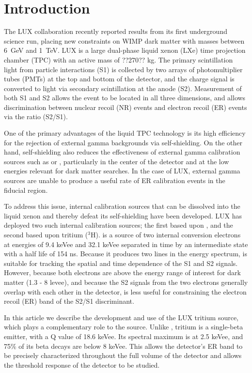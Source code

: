 \section{Introduction}

The LUX collaboration recently reported results from its first underground science run, placing new constraints on WIMP dark matter with masses between 6~GeV and 1~TeV\cite{lux_prl}. LUX is a large dual-phase liquid xenon (LXe) time projection chamber (TPC) with an active mass of ??270?? kg. The primary scintillation light from particle interactions (S1) is collected by two arrays of photomultiplier tubes (PMTs) at the top and bottom of the detector, and the charge signal is converted to light via secondary scintillation at the anode (S2). Measurement of both S1 and S2 allows the event to be located in all three dimensions, and allows discrimination between nuclear recoil (NR) events and electron recoil (ER) events via the ratio (S2/S1).

One of the primary advantages of the liquid TPC technology is its high efficiency for the rejection of external gamma backgrounds via self-shielding. On the other hand, self-shielding also reduces the effectiveness of external gamma calibration sources such as \cssrc or \thsrc, particularly in the center of the detector and at the low energies relevant for dark matter searches. In the case of LUX, external gamma sources are unable to produce a useful rate of ER calibration events in the fiducial region.  

To address this issue, internal calibration sources that can be dissolved into the liquid xenon and thereby defeat its self-shielding have been developed\cite{Kastens:2009rt}. LUX has deployed two such internal calibration sources; the first based upon \krsrc, and the second based upon tritium ($^{3}$H). \krsrc is a source of two internal conversion electrons at energies of 9.4 keVee and 32.1 keVee separated in time by an intermediate state with a half life of 154 ns. Because it produces two lines in the energy spectrum, \krsrc is suitable for tracking the spatial and time dependence of the S1 and S2 signals. However, because both \krsrc electrons are above the energy range of interest for dark matter (1.3 - 8 levee), and because the S2 signals from the two electrons generally overlap with each other in the detector,  \krsrc is less useful for constraining the electron recoil (ER) band of the S2/S1 discriminant. 

In this article we describe the development and use of the LUX tritium source, which plays a complementary role to the \krsrc source. Unlike \krsrc, tritium is a single-beta emitter, with a Q value of 18.6 keVee. Its spectral maximum is at 2.5 keVee, and 75\% of its beta decays are below 8 keVee. This allows the detector's ER band to be precisely characterized throughout the full volume of the detector and allows the threshold response of the detector to be studied.

